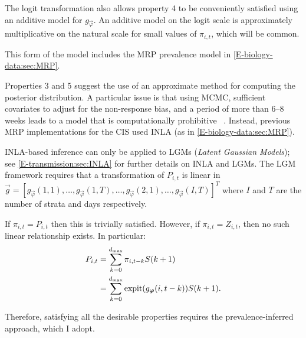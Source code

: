 \documentclass[thesis.tex]{subfiles}
\begin{document}
The logit transformation also allows property 4 to be conveniently satisfied using an additive model for $g_{\vec{\varphi}}$.
An additive model on the logit scale is approximately multiplicative on the natural scale for small values of $\pi_{i,t}$, which will be common.

This form of the model includes the MRP prevalence model in \cref{E-biology-data:sec:MRP}.




Properties 3 and 5 suggest the use of an approximate method for computing the posterior distribution.
A particular issue is that using MCMC, sufficient covariates to adjust for the non-response bias, and a period of more than 6--8 weeks leads to a model that is computationally prohibitive ~.
Instead, previous MRP implementations for the CIS used INLA (as in \cref{E-biology-data:sec:MRP}).

INLA-based inference can only be applied to LGMs (\emph{Latent Gaussian Models}); see \cref{E-transmission:sec:INLA} for further details on INLA and LGMs.
The LGM framework requires that a transformation of $P_{i,t}$ is linear in $\vec{g} = [g_{{\vec{\varphi}}}(1, 1), \dots, g_{{\vec{\varphi}}}(1, T), \dots, g_{{\vec{\varphi}}}(2, 1), \dots, g_{{\vec{\varphi}}}(I, T)]^T$ where $I$ and $T$ are the number of strata and days respectively.

If $\pi_{i,t} = P_{i,t}$ then this is trivially satisfied.
However, if $\pi_{i,t} = Z_{i,t}$, then no such linear relationship exists.
In particular:
\begin{align}
    P_{i,t}
    &= \sum_{k=0}^{d_\text{max}} \pi_{i,t-k} S(k+1) \\
    &= \sum_{k=0}^{d_\text{max}} \operatorname{expit}(g_{\bm{\varphi}}(i, t-k)) S(k+1).
\end{align}

Therefore, satisfying all the desirable properties requires the prevalence-inferred approach, which I adopt.
\end{document}
